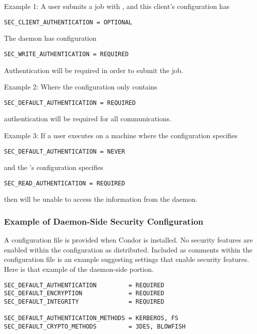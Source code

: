 Example 1: A user submits a job with , and this
client's configuration has
\begin{verbatim}
SEC_CLIENT_AUTHENTICATION = OPTIONAL 
\end{verbatim}
The  daemon
has configuration 
\begin{verbatim}
SEC_WRITE_AUTHENTICATION = REQUIRED
\end{verbatim}
Authentication will be required in order to submit the job. 

Example 2: Where the configuration only contains
\begin{verbatim}
SEC_DEFAULT_AUTHENTICATION = REQUIRED
\end{verbatim}
authentication will
be required for all communications. 

Example 3: If a user executes  on a machine
where the configuration specifies
\begin{verbatim}
SEC_DEFAULT_AUTHENTICATION = NEVER
\end{verbatim}
and the 's configuration specifies
\begin{verbatim}
SEC_READ_AUTHENTICATION = REQUIRED
\end{verbatim}
then  will be
unable to access the information from the  daemon.



\subsubsection{\label{sec:Security-sample1} Example of Daemon-Side Security Configuration}

A configuration file is provided when Condor is installed.
No security features are enabled within the configuration as
distributed.
Included as comments within the configuration file is an example 
suggesting settings that enable security features.
Here is that example of the daemon-side portion.

\footnotesize
\begin{verbatim}
SEC_DEFAULT_AUTHENTICATION         = REQUIRED
SEC_DEFAULT_ENCRYPTION             = REQUIRED
SEC_DEFAULT_INTEGRITY              = REQUIRED

SEC_DEFAULT_AUTHENTICATION_METHODS = KERBEROS, FS
SEC_DEFAULT_CRYPTO_METHODS         = 3DES, BLOWFISH
\end{verbatim}
\normalsize

